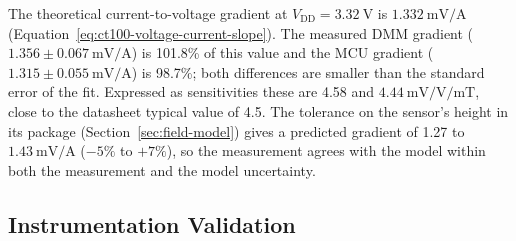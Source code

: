 \documentclass[12pt,a4paper]{article}
\begin{document}
\begin{figure}[H]
\begin{minipage}[t]{0.48\textwidth}

        \label{fig:current-cross-val}

    \end{minipage}
\end{figure}

The theoretical current-to-voltage gradient at $V_{\text{DD}} = \SI{3.32}{\volt}$ is $\SI{1.332}{\milli\volt\per\ampere}$ (Equation~\eqref{eq:ct100-voltage-current-slope}). The measured DMM gradient ($1.356 \pm \SI{0.067}{\milli\volt\per\ampere}$) is 101.8\% of this value and the MCU gradient ($1.315 \pm \SI{0.055}{\milli\volt\per\ampere}$) is 98.7\%; both differences are smaller than the standard error of the fit. Expressed as sensitivities these are 4.58 and $\SI{4.44}{\milli\volt\per\volt\per\milli\tesla}$, close to the datasheet typical value of 4.5. The tolerance on the sensor's height in its package (Section~\ref{sec:field-model}) gives a predicted gradient of 1.27 to $\SI{1.43}{\milli\volt\per\ampere}$ ($-5\%$ to $+7\%$), so the measurement agrees with the model within both the measurement and the model uncertainty.

\subsection{Instrumentation Validation}
\label{sec:instr-validation}
\end{document}
